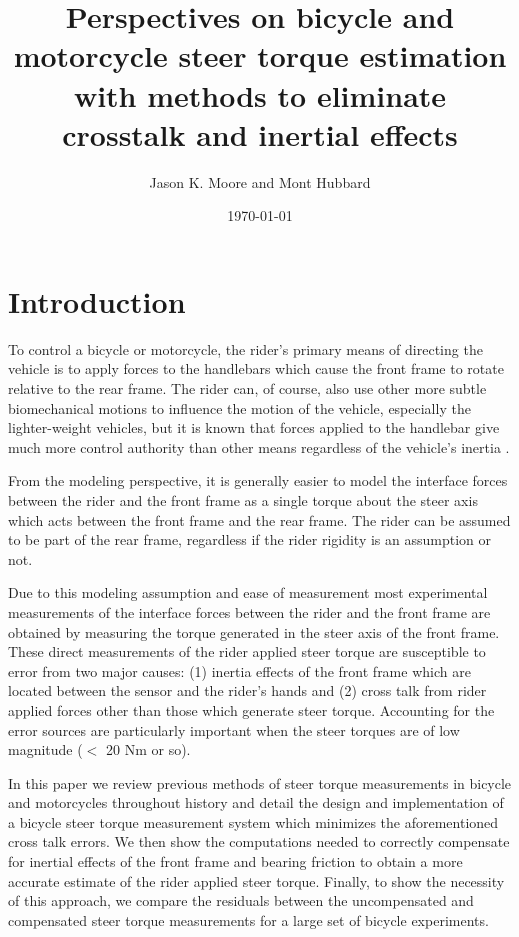 \documentclass[a4paper]{article}
\title{Perspectives on bicycle and motorcycle steer torque estimation with
  methods to eliminate crosstalk and inertial effects}
\author{Jason K. Moore and Mont Hubbard}
\date{\today}
\begin{document}
\maketitle

\section*{Introduction}

To control a bicycle or motorcycle, the rider's primary means of directing the
vehicle is to apply forces to the handlebars which cause the front frame to
rotate relative to the rear frame. The rider can, of course, also use other
more subtle biomechanical motions to influence the motion of the vehicle,
especially the lighter-weight vehicles, but it is known that forces
applied to the handlebar give much more control authority than other means
regardless of the vehicle's inertia \cite{Sharp2007,Sharp2008a}.

From the modeling perspective, it is generally easier to model the interface
forces between the rider and the front frame as a single torque about the steer
axis which acts between the front frame and the rear frame. The rider can be
assumed to be part of the rear frame, regardless if the rider rigidity is an
assumption or not.

Due to this modeling assumption and ease of measurement most experimental
measurements of the interface forces between the rider and the front frame are
obtained by measuring the torque generated in the steer axis of the front
frame. These direct measurements of the rider applied steer torque are
susceptible to error from two major causes: (1) inertia effects of the front
frame which are located between the sensor and the rider's hands and (2) cross
talk from rider applied forces other than those which generate steer torque.
Accounting for the error sources are particularly important when the steer
torques are of low magnitude ($<$ 20 Nm or so).

In this paper we review previous methods of steer torque measurements in
bicycle and motorcycles throughout history and detail the design and
implementation of a bicycle steer torque measurement system which minimizes the
aforementioned cross talk errors. We then show the computations needed to
correctly compensate for inertial effects of the front frame and bearing
friction to obtain a more accurate estimate of the rider applied steer torque.
Finally, to show the necessity of this approach, we compare the residuals
between the uncompensated and compensated steer torque measurements for a large
set of bicycle experiments.
\end{document}
